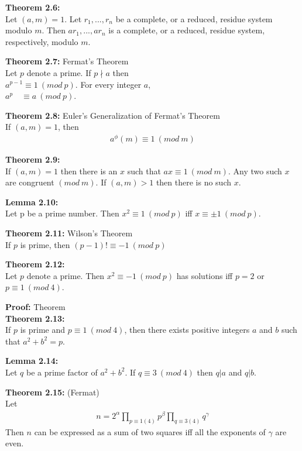 \documentclass[a4paper]{article}
\begin{document}
\textbf{Theorem 2.6:}\\
Let $(a,m)=1$. Let $r_1,...,r_n$ be a complete, or a reduced, residue system modulo $m$. Then $ar_1,...,ar_n$ is a complete, or a reduced, residue system, respectively, modulo $m$.


\textbf{Theorem 2.7:} Fermat's Theorem\\
Let $p$ denote a prime. If $p\nmid a$ then\\
$a^{p-1}\equiv 1\ (mod\ p)$. For every integer $a$,\\
$a^{p}\quad\equiv a\ (mod\ p)$.

\textbf{Theorem 2.8:} Euler's Generalization of Fermat's Theorem\\
If $(a,m)=1$, then
\begin{align}
    a^\phi(m)\equiv 1\ (mod\ m)
\end{align}

\textbf{Theorem 2.9:}\\
If $(a,m)=1$ then there is an $x$ such that $ax\equiv 1\ (mod\ m)$. Any two such $x$ are congruent $(mod\ m)$. If $(a,m)>1$ then there is no such $x$.

\textbf{Lemma 2.10:}\\
Let p be a prime number. Then $x^2\equiv 1\ (mod\ p)$ iff $x\equiv\pm 1\ (mod\ p)$.

\textbf{Theorem 2.11:} Wilson's Theorem\\
If $p$ is prime, then $(p-1)!\equiv -1\ (mod\ p)$

\textbf{Theorem 2.12:}\\
Let $p$ denote a prime. Then $x^2\equiv -1\ (mod\ p)$ has solutions iff $p=2$ or $p\equiv 1\ (mod\ 4)$.


\textbf{Proof:} Theorem \\

\textbf{Theorem 2.13:}\\
If $p$ is prime and $p\equiv 1\ (mod\ 4)$, then there exists positive integers
$a$ and $b$ such that $a^2+b^2=p$.


\textbf{Lemma 2.14:}\\
Let $q$ be a prime factor of $a^2+b^2$. If $q\equiv 3\ (mod\ 4)$ then $q|a$ and $q|b$.


\textbf{Theorem 2.15:} (Fermat)\\
Let
\begin{align}
    n =  2^\alpha\prod_{p\equiv 1(4)}p^\beta\prod_{q\equiv 3(4)}q^\gamma
\end{align}
Then $n$ can be expressed as a sum of two squares iff all the exponents of $\gamma$ are even.
\end{document}
